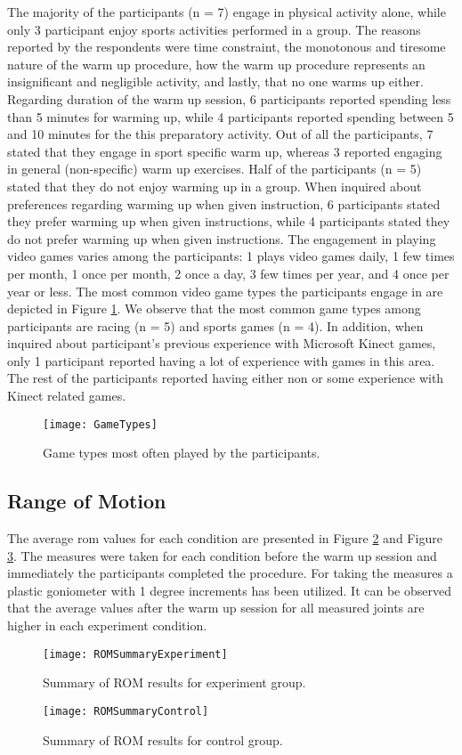 The majority of the participants (n = 7) engage in physical activity alone, while only 3 participant enjoy sports activities performed in a group. The reasons reported by the respondents were time constraint, the monotonous and tiresome nature of the warm up procedure, how the warm up procedure represents an insignificant and negligible activity, and lastly, that no one warms up either. Regarding duration of the warm up session, 6 participants reported spending less than 5 minutes for warming up, while 4 participants reported spending between 5 and 10 minutes for the this preparatory activity. Out of all the participants, 7 stated that they engage in sport specific warm up, whereas 3 reported engaging in general  (non-specific) warm up exercises. Half of the participants (n = 5) stated that they do not enjoy warming up in a group. When inquired about preferences regarding warming up when given instruction, 6 participants stated they prefer warming up when given instructions, while 4 participants stated they do not prefer warming up when given instructions. The engagement in playing video games varies among the participants: 1 plays video games daily, 1 few times per month, 1 once per month, 2 once a day, 3 few times per year, and 4 once per year or less. The most common video game types the participants engage in are depicted in Figure \ref{fig:gametypes}. We observe that the most common game types among participants are racing (n = 5) and sports games (n = 4). In addition, when inquired about participant's previous experience with Microsoft Kinect games, only 1 participant reported having a lot of experience with games in this area. The rest of the participants reported having either non or some experience with Kinect related games.\\
\begin{figure}[h]
    \centering
    \texttt{[image: GameTypes]}
    \caption{Game types most often played by the participants.}
    \label{fig:gametypes}
\end{figure}

\subsection{Range of Motion}
The average \acrshort{rom} values for each condition are presented in Figure \ref{fig:romExperiment} and Figure \ref{fig:romControl}. The measures were taken for each condition before the warm up session and immediately the participants completed the procedure. For taking the measures a plastic goniometer with 1 degree increments has been utilized. It can be observed that the average values after the warm up session for all measured joints are higher in each experiment condition. 
\begin{figure}[h]
    \centering
    \texttt{[image: ROMSummaryExperiment]}
    \caption{Summary of ROM results for experiment group.}
    \label{fig:romExperiment}
\end{figure}
\begin{figure}[h]
    \centering
    \texttt{[image: ROMSummaryControl]}
    \caption{Summary of ROM results for control group.}
    \label{fig:romControl}
\end{figure}
